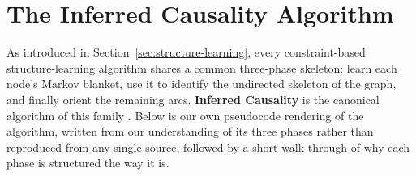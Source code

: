 \section{The Inferred Causality Algorithm}
\label{sec:inferred-causality}

As introduced in Section~\ref{sec:structure-learning}, every constraint-based
structure-learning algorithm shares a common three-phase skeleton: learn each
node's Markov blanket, use it to identify the undirected skeleton of the
graph, and finally orient the remaining arcs. \textbf{Inferred Causality} is
the canonical algorithm of this family
\autocite{pellet2008markov,alvi2018pgm}. Below is our own pseudocode
rendering of the algorithm, written from our understanding of its three
phases rather than reproduced from any single source, followed by a short
walk-through of why each phase is structured the way it is.

